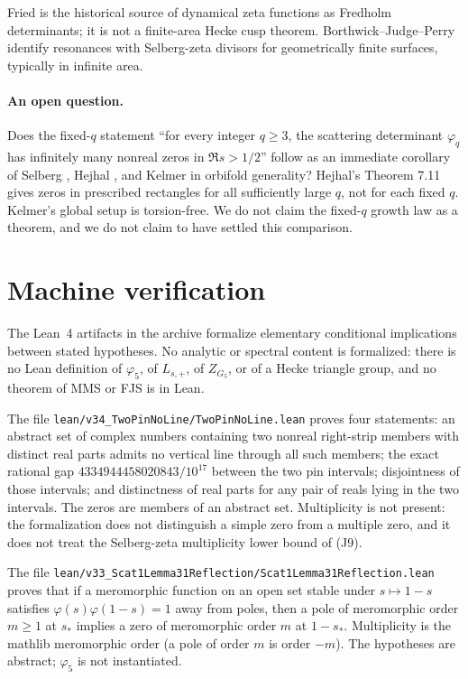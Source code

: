 \documentclass[11pt]{amsart}
\theoremstyle{definition}
\theoremstyle{remark}
\newcommand{\phif}{\varphi_5}
\newcommand{\phiq}{\varphi_q}
\newcommand{\Zf}{Z_{G_5}}
\begin{document}
Fried \cite{Fried1986} is the historical source of dynamical zeta
functions as Fredholm determinants; it is not a finite-area Hecke
cusp theorem. Borthwick--Judge--Perry \cite{BJP2005} identify
resonances with Selberg-zeta divisors for geometrically finite
surfaces, typically in infinite area.

\paragraph{An open question.}
Does the fixed-$q$ statement ``for every integer $q\ge 3$, the
scattering determinant $\phiq$ has infinitely many nonreal zeros in
$\Re s>1/2$'' follow as an immediate corollary of Selberg
\cite{Selberg1990}, Hejhal \cite{Hejhal1983}, and Kelmer
\cite{Kelmer2015} in orbifold generality? Hejhal's Theorem 7.11
gives zeros in prescribed rectangles for all sufficiently large
$q$, not for each fixed $q$. Kelmer's global setup is torsion-free.
We do not claim the fixed-$q$ growth law as a theorem, and we do
not claim to have settled this comparison.

\section{Machine verification}
\label{sec:lean}

The Lean~4 artifacts in the archive formalize elementary
conditional implications between stated hypotheses. No analytic or
spectral content is formalized: there is no Lean definition of
$\phif$, of $L_{s,+}$, of $\Zf$, or of a Hecke triangle group, and
no theorem of MMS or FJS is in Lean.

The file \texttt{lean/\allowbreak v34\_TwoPinNoLine/\allowbreak TwoPinNoLine.lean} proves
four statements: an abstract set of complex numbers containing two
nonreal right-strip members with distinct real parts admits no
vertical line through all such members; the exact rational gap
$4334944458020843/10^{17}$ between the two pin intervals; disjointness
of those intervals; and distinctness of real parts for any pair of
reals lying in the two intervals. The zeros are members of an
abstract set. Multiplicity is not present: the formalization does
not distinguish a simple zero from a multiple zero, and it does not
treat the Selberg-zeta multiplicity lower bound of (J9).

The file
\texttt{lean/\allowbreak v33\_Scat1Lemma31Reflection/\allowbreak }\allowbreak\texttt{Scat1Lemma31Reflection.lean}
proves that if a meromorphic function on an open set stable under
$s\mapsto 1-s$ satisfies $\varphi(s)\varphi(1-s)=1$ away from poles,
then a pole of meromorphic order $m\ge 1$ at $s_*$ implies a zero of
meromorphic order $m$ at $1-s_*$. Multiplicity is the mathlib
meromorphic order (a pole of order $m$ is order $-m$). The
hypotheses are abstract; $\phif$ is not instantiated.
\end{document}
